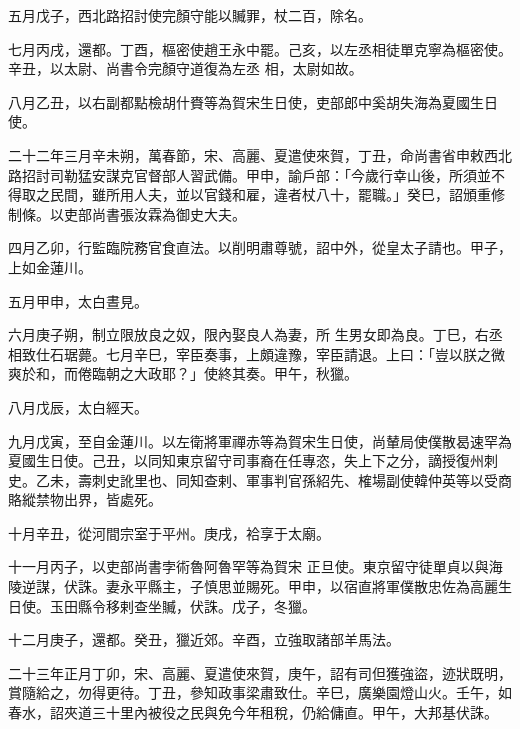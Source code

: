 \begin{pinyinscope}
 五月戊子，西北路招討使完顏守能以贓罪，杖二百，除名。



 七月丙戌，還都。丁酉，樞密使趙王永中罷。己亥，以左丞相徒單克寧為樞密使。辛丑，以太尉、尚書令完顏守道復為左丞
 相，太尉如故。



 八月乙丑，以右副都點檢胡什賚等為賀宋生日使，吏部郎中奚胡失海為夏國生日使。



 二十二年三月辛未朔，萬春節，宋、高麗、夏遣使來賀，丁丑，命尚書省申敕西北路招討司勒猛安謀克官督部人習武備。甲申，諭戶部：「今歲行幸山後，所須並不得取之民間，雖所用人夫，並以官錢和雇，違者杖八十，罷職。」癸巳，詔頒重修制條。以吏部尚書張汝霖為御史大夫。



 四月乙卯，行監臨院務官食直法。以削明肅尊號，詔中外，從皇太子請也。甲子，上如金蓮川。



 五月甲申，太白晝見。



 六月庚子朔，制立限放良之奴，限內娶良人為妻，所
 生男女即為良。丁巳，右丞相致仕石琚薨。七月辛巳，宰臣奏事，上頗違豫，宰臣請退。上曰：「豈以朕之微爽於和，而倦臨朝之大政耶？」使終其奏。甲午，秋獵。



 八月戊辰，太白經天。



 九月戊寅，至自金蓮川。以左衛將軍禪赤等為賀宋生日使，尚輦局使僕散曷速罕為夏國生日使。己丑，以同知東京留守司事裔在任專恣，失上下之分，謫授復州刺史。乙未，壽刺史訛里也、同知查剌、軍事判官孫紹先、榷場副使韓仲英等以受商賂縱禁物出界，皆處死。



 十月辛丑，從河間宗室于平州。庚戌，袷享于太廟。



 十一月丙子，以吏部尚書孛術魯阿魯罕等為賀宋
 正旦使。東京留守徒單貞以與海陵逆謀，伏誅。妻永平縣主，子慎思並賜死。甲申，以宿直將軍僕散忠佐為高麗生日使。玉田縣令移剌查坐贓，伏誅。戊子，冬獵。



 十二月庚子，還都。癸丑，獵近郊。辛酉，立強取諸部羊馬法。



 二十三年正月丁卯，宋、高麗、夏遣使來賀，庚午，詔有司但獲強盜，迹狀既明，賞隨給之，勿得更待。丁丑，參知政事梁肅致仕。辛巳，廣樂園燈山火。壬午，如春水，詔夾道三十里內被役之民與免今年租稅，仍給傭直。甲午，大邦基伏誅。




\end{pinyinscope}
